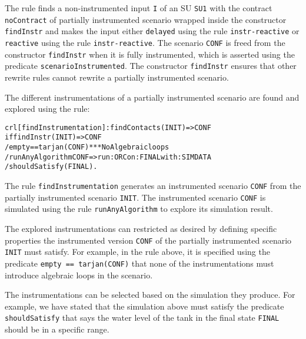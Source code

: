 The rule finds a non-instrumented input \texttt{I} of an SU \texttt{SU1} with the contract \texttt{noContract} of partially instrumented scenario wrapped inside the constructor \texttt{findInstr} and makes the input either \texttt{delayed} using the rule \texttt{instr-reactive} or \texttt{reactive} using the rule \texttt{instr-reactive}.
The scenario \texttt{CONF} is freed from the constructor \texttt{findInstr} when it is fully instrumented, which is asserted using the predicate \texttt{scenarioInstrumented}.
The constructor \texttt{findInstr} ensures that other rewrite rules cannot rewrite a partially instrumented scenario.

The different instrumentations of a partially instrumented scenario are found and explored using the rule:

\small
\begin{alltt}
crl [findInstrumentation]: findContacts(INIT) => CONF
    if findInstr(INIT) => CONF
    / empty == tarjan(CONF) *** No Algebraic loops
    / runAnyAlgorithm CONF => run: ORC on: FINAL with: SIMDATA
    / shouldSatisfy(FINAL) .
\end{alltt}
\normalsize

The rule \texttt{findInstrumentation} generates an instrumented scenario \texttt{CONF} from the partially instrumented scenario \texttt{INIT}.
The instrumented scenario \texttt{CONF} is simulated using the rule \texttt{runAnyAlgorithm} to explore its simulation result.

The explored instrumentations can restricted as desired by defining specific properties the instrumented version \texttt{CONF} of the partially instrumented scenario \texttt{INIT} must satisfy.
For example, in the rule above, it is specified using the predicate \texttt{empty == tarjan(CONF)} that none of the instrumentations must introduce algebraic loops in the scenario.

The instrumentations can be selected based on the simulation they produce. 
For example, we have stated that the simulation above must satisfy the predicate \texttt{shouldSatisfy} that says the water level of the tank in the final state \texttt{FINAL} should be in a specific range.

